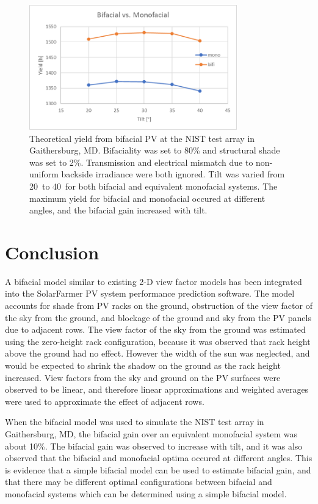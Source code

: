 \documentclass[conference]{IEEEtran}
\begin{document}
\begin{figure}
\centering
\includegraphics[width=9cm]{NIST_bifi-v-mono.png}
\caption{Theoretical yield from bifacial PV at the NIST test array in Gaithersburg, MD.  Bifaciality was set to 80\% and structural shade was set to 2\%.  Transmission and electrical mismatch due to non-uniform backside irradiance were both ignored.  Tilt was varied from 20\degree\ to 40\degree\ for both bifacial and equivalent monofacial systems.  The maximum yield for bifacial and monofacial occured at different angles, and the bifacial gain increased with tilt.}
\label{fig:NIST-bifi-v-mono}
\end{figure}




\section{Conclusion}
A bifacial model similar to existing 2-D view factor models has been integrated into the SolarFarmer PV system performance prediction software.  The model accounts for shade from PV racks on the ground, obstruction of the view factor of the sky from the ground, and blockage of the ground and sky from the PV panels due to adjacent rows.  The view factor of the sky from the ground was estimated using the zero-height rack configuration, because it was observed that rack height above the ground had no effect.  However the width of the sun was neglected, and would be expected to shrink the shadow on the ground as the rack height increased.  View factors from the sky and ground on the PV surfaces were observed to be linear, and therefore linear approximations and weighted averages were used to approximate the effect of adjacent rows.

When the bifacial model was used to simulate the NIST test array in Gaithersburg, MD, the bifacial gain over an equivalent monofacial system was about 10\%.  The bifacial gain was observed to increase with tilt, and it was also observed that the bifacial and monofacial optima occured at different angles.  This is evidence that a simple bifacial model can be used to estimate bifacial gain, and that there may be different optimal configurations between bifacial and monofacial systems which can be determined using a simple bifacial model.
\end{document}
